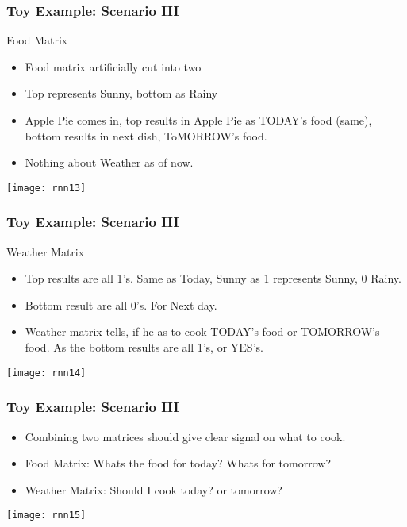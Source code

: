 \begin{frame}[fragile] \frametitle{Toy Example: Scenario III}
Food Matrix
\begin{itemize}
\item Food matrix artificially cut into two
\item Top represents Sunny, bottom as Rainy
\item Apple Pie comes in, top results in Apple Pie as TODAY's food (same), bottom results in next dish, ToMORROW's food.
\item Nothing about Weather as of now.
\end{itemize}
\begin{center}
\texttt{[image: rnn13]}
\end{center}
\end{frame}

\begin{frame}[fragile] \frametitle{Toy Example: Scenario III}
Weather Matrix
\begin{itemize}
\item Top results are all 1's. Same as Today, Sunny as 1 represents Sunny, 0 Rainy.
\item Bottom result are all 0's. For Next day.
\item Weather matrix tells, if he as to cook TODAY's food or TOMORROW's food. As the bottom results are all 1's, or YES's.
\end{itemize}
\begin{center}
\texttt{[image: rnn14]}
\end{center}
\end{frame}

\begin{frame}[fragile] \frametitle{Toy Example: Scenario III}
\begin{itemize}
\item Combining two matrices should give clear signal on what to cook.
\item Food Matrix: Whats the food for today? Whats for tomorrow?
\item Weather Matrix: Should I cook today? or tomorrow?
\end{itemize}
\begin{center}
\texttt{[image: rnn15]}
\end{center}
\end{frame}


